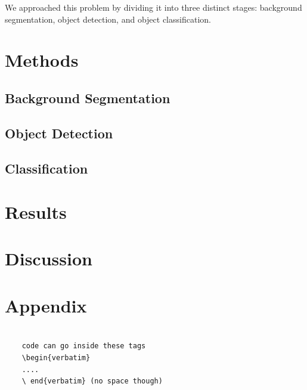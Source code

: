 \documentclass[12pt]{article}
\begin{document}
We approached this problem by dividing it into three distinct stages: background segmentation, object detection, and object classification.

\section{Methods}

\subsection{Background Segmentation}

\subsection{Object Detection}

\subsection{Classification}

\section{Results}

\section{Discussion}

\section*{Appendix}

\begin{verbatim}
	
	code can go inside these tags 
	\begin{verbatim} 
	.... 
	\ end{verbatim} (no space though)
	
\end{verbatim}
\end{document}
